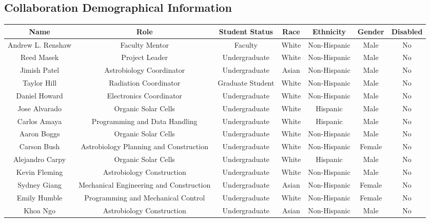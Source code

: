 \begin{appendices}
  \section{Collaboration Demographical Information}
  \begin{table}[h!]
    \centering  
    \begin{tabular}  {ccccccc}
  	  \hline
	  \hline
      \textbf{Name} &  \textbf{Role} & \textbf{Student Status} & \textbf{Race} & \textbf{Ethnicity} & \textbf{Gender} & \textbf{Disabled}\\
 	  \hline
 	  Andrew L. Renshaw & Faculty Mentor & Faculty & White & Non-Hispanic & Male & No\\ \hline
 	  Reed Masek & Project Leader & Undergraduate & White & Non-Hispanic & Male & No\\ \hline
 	  Jimish Patel & Astrobiology Coordinator & Undergraduate & Asian & Non-Hispanic & Male & No \\ \hline
      Taylor Hill & Radiation Coordinator & Graduate Student & White & Non-Hispanic & Male & No\\ \hline
      Daniel Howard & Electronics Coordinator & Undergraduate & White & Non-Hispanic & Male & No \\ \hline
      Jose Alvarado & Organic Solar Cells & Undergraduate & White & Hispanic & Male & No \\ \hline
      Carlos Amaya & Programming and Data Handling & Undergraduate & White & Hispanic & Male & No \\ \hline
      Aaron Boggs & Organic Solar Cells & Undergraduate & White & Non-Hispanic & Male & No \\ \hline
      Carson Bush & Astrobiology Planning and Construction & Undergraduate & White & Non-Hispanic & Female & No \\ \hline
      Alejandro Carpy & Organic Solar Cells & Undergraduate & White & Hispanic & Male & No \\ \hline
      Kevin Fleming & Astrobiology Construction & Undergraduate & White & Non-Hispanic & Male & No \\ \hline
      Sydney Giang & Mechanical Engineering and Construction & Undergraduate & Asian & Non-Hispanic & Female & No \\ \hline
      Emily Humble & Programming and Mechanical Control & Undergraduate & White & Non-Hispanic & Female & No \\ \hline
      Khoa Ngo & Astrobiology Construction & Undergraduate & Asian & Non-Hispanic & Male & No \\ \hline

\end{tabular}
\end{table}
\end{appendices}
